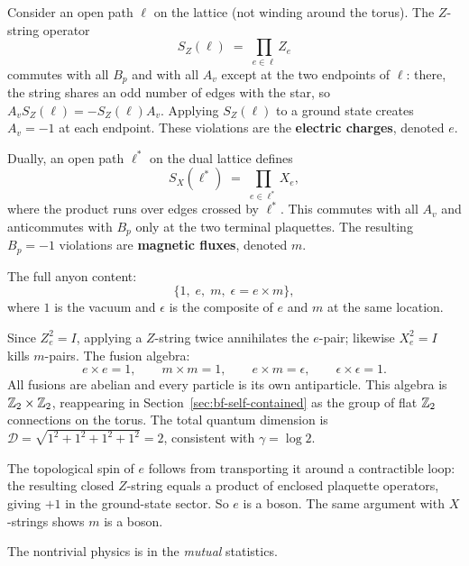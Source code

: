 Consider an open path $\ell$ on the lattice (not winding around the torus).  The $Z$-string operator
\begin{equation}\label{eq:open-z-string}
    S_Z(\ell) \;=\; \prod_{e \in \ell} Z_e
\end{equation}
commutes with all $B_p$ and with all $A_v$ except at the two endpoints of $\ell$: there, the string shares an odd number of edges with the star, so $A_v S_Z(\ell) = -S_Z(\ell) A_v$.  Applying $S_Z(\ell)$ to a ground state creates $A_v = -1$ at each endpoint.  These violations are the \textbf{electric charges}, denoted $e$.

Dually, an open path $\ell^*$ on the dual lattice defines
\begin{equation}\label{eq:open-x-string}
    S_X(\ell^*) \;=\; \prod_{e \in \ell^*} X_e,
\end{equation}
where the product runs over edges crossed by $\ell^*$.  This commutes with all $A_v$ and anticommutes with $B_p$ only at the two terminal plaquettes.  The resulting $B_p = -1$ violations are \textbf{magnetic fluxes}, denoted $m$.

The full anyon content:
\begin{equation}\label{eq:anyon-types}
    \{1,\; e,\; m,\; \epsilon = e \times m\},
\end{equation}
where $1$ is the vacuum and $\epsilon$ is the composite of $e$ and $m$ at the same location.

Since $Z_e^2 = I$, applying a $Z$-string twice annihilates the $e$-pair; likewise $X_e^2 = I$ kills $m$-pairs.  The fusion algebra:
\begin{equation}\label{eq:fusion-rules}
    e \times e = 1, \qquad m \times m = 1, \qquad e \times m = \epsilon, \qquad \epsilon \times \epsilon = 1.
\end{equation}
All fusions are abelian and every particle is its own antiparticle.  This algebra is $\mathbb{Z}_2 \times \mathbb{Z}_2$, reappearing in Section~\ref{sec:bf-self-contained} as the group of flat $\mathbb{Z}_2$ connections on the torus.  The total quantum dimension is $\mathcal{D} = \sqrt{1^2 + 1^2 + 1^2 + 1^2} = 2$, consistent with $\gamma = \log 2$.

The topological spin of $e$ follows from transporting it around a contractible loop: the resulting closed $Z$-string equals a product of enclosed plaquette operators, giving $+1$ in the ground-state sector.  So $e$ is a boson.  The same argument with $X$-strings shows $m$ is a boson.

The nontrivial physics is in the \emph{mutual} statistics.


